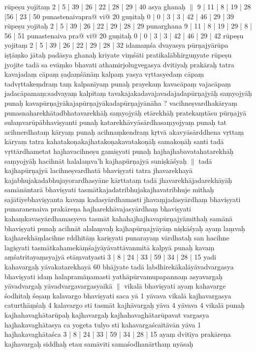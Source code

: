 \documentclass[10pt]{article}
\begin{document}
rūpeṣu yojitaṃ 2 | 5 | 39 | 26 | 22 | 28 | 29 | 40 asya ghanaḥ   $\|$ 
9 | 11 | 8 | 19 | 28 |56 | 23 | 50 punastenaivapra@ vi@ 
20 guṇitaḥ 0 | 0 | 3 | 3 | 42 | 46 | 29 | 39  
rūpeṣu yojitaḥ 2 | 5 | 39 | 26 | 22 | 29 | 28 | 29 punarghana 9 | 11 | 8 | 19 | 29 | 8 | 56 | 51 punastenaiva pra@  vi@ 20 guṇitaḥ 0 | 0 | 3 | 3 | 42 | 46 | 29 | 42 
rūpeṣu yojitaṃ 2 | 5 | 39 | 26 | 22 | 29 | 28 | 32 
idamaṃśa dvayasya pūrṇajyārūpa iṣṭāṃko jātaḥ padāsya ghanaḥ kriyate viṃśāti pratikalābhirguṇyate 
rūpeṣu  jyojite tadā sa evāṃko bhavati athamirjolugvegasya dvitīyaḥ prakāraḥ tatra kavajadaṃ cāpaṃ ṣaḍaṃśānāṃ kalpaṃ 
yasya vṛttasyedaṃ cāpaṃ tadvṛttakeṃdraṃ taṃ kalpanīyaṃ punaḥ prayekaṃ kavacāpaṃ vajacāpaṃ jadacāpamaṃ:sadvayaṃ kalpitaṃ 
tavakajakadavajavadajadapūrṇajyāḥ saṃyojyāḥ punaḥ kavapūrṇajyākajapūrṇajyākadapūrṇajyānāha ? 
vacihneṣvardhakāryaṃ punasnaharekhātadbhatavarekhāḥ saṃyojyāḥ etārekhāḥ  pratekaṃtāsu pūrṇajyā sulaṃvarūpābhaviṣyanti punaḥ katarekhāvyāsārdhasaṃyojyaṃ punaḥ tat acihnerdhataṃ kāryaṃ punaḥ acihnaṃkendraṃ kṛtvā 
akavyāsārddhena vṛttaṃ kāryaṃ tatra kahatakoṇakajhatakoṇakavatakoṇāḥ samakoṇāḥ santi tadā vṛttārdhametat hajhavacihneṣu gamiṣyati punaḥ hajhajhabavatahatarekhāḥ saṃyojyāḥ hacihnāt halalaṃva'h kajhapūrṇajyā suniṣkāśyaḥ $\|$ 
tadā kajhapūrṇajyā lacihneṣvardhatā bhaviṣyati tatra jhavarekhayā kajabhujakadabhujayorardhasyāne kārttataṃ tadā jhavarekhājadarekhāyāḥ samānāntarā bhaviṣyati tasmātkajadatribhujakajhavatribhuje mithaḥ sajātīyebhaviṣyanta kavaṃ kadasyārdhamasti jhavaṃjadasyārdhaṃ bhaviṣyati 
punaranenaiva prakāreṇa hajharekhāvajasyārdhaṃ bhaviṣyati kahaṃkavasyārdhamasyeva tasmāt kahahajhajhavapūrṇajyāmithaḥ samānā bhaviṣyati 
punaḥ acihnāt alalaṃvaḥ kajhapūrṇajyāyāṃ niṣkāśyaḥ ayaṃ laṃvaḥ kajharekhāṃlacihne rddhitāṃ kariṣyati 
punarayaṃ vārdhataḥ san hacihne lagiṣyati tasmātkahamekāṃśajyāyāvattāvanmitā kalpyā punaḥ kavaṃ aṃśatritayaṃsyajyā etāṃvatyasti 3 | 8 | 24 | 33 | 59 | 34 | 28 | 15 
yadi kahavargaḥ yāvakatarekhayā 60 bhājyate tadā labdhirekākalāyāvadvargasya bhaviṣyati idaṃ halapramāṇamasti yathāpūrvamupapannaṃ asyavargaḥ yāvadvargaḥ yāvadvargavargasyaikā $\|$ 
vikalā bhaviṣyati ayaṃ kahavarge śodhitaḥ śeṣaṃ kalavargo bhaviṣyati saca yā 1 yāvava vikalā kajhavargasya caturthāṃśaḥ 4 
kalavargo sti tasmāt kajhāvargaḥ yāva 4 yāvava 4 vikalā punaḥ kajhahavaghātarūpaḥ 
kajhavargaḥ kajhahavaghātarūpavat vargasya  hajhakavaghātasya ca yogeta tulyo sti 
kahavargaścaitāvān yāva 1 hajhakavaghātaśca 3 | 8 | 24 | 33 | 59 | 34 | 28 | 15 ayaṃ 
dvitīya prakāreṇa kajhavargaḥ siddhaḥ etau samāviti samaśodhanārthaṃ nyāsaḥ  
\end{document}
